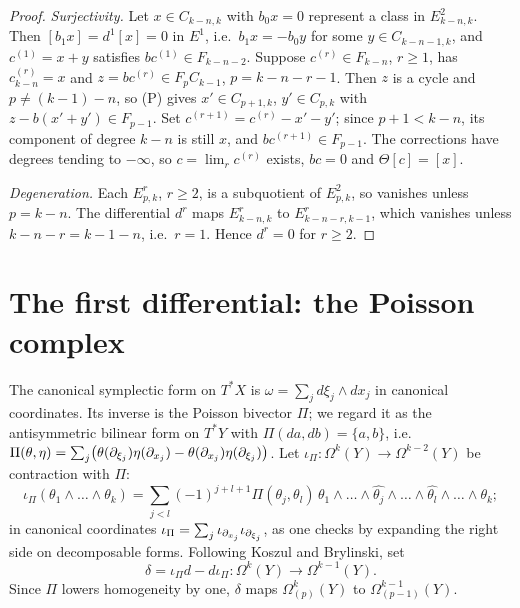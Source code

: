 \begin{proof}
\emph{Surjectivity.} Let $x\in C_{k-n,k}$ with $b_0x=0$ represent a class in
$E^2_{k-n,k}$. Then $[b_1x]=d^1[x]=0$ in $E^1$, i.e.\ $b_1x=-b_0y$ for some
$y\in C_{k-n-1,k}$, and $c^{(1)}=x+y$ satisfies $bc^{(1)}\in F_{k-n-2}$.
Suppose $c^{(r)}\in F_{k-n}$, $r\ge1$, has $c^{(r)}_{k-n}=x$ and
$z=bc^{(r)}\in F_{p}C_{k-1}$, $p=k-n-r-1$. Then $z$ is a cycle and
$p\ne(k-1)-n$, so (P) gives $x'\in C_{p+1,k}$, $y'\in C_{p,k}$ with
$z-b(x'+y')\in F_{p-1}$. Set $c^{(r+1)}=c^{(r)}-x'-y'$; since $p+1<k-n$, its
component of degree $k-n$ is still $x$, and $bc^{(r+1)}\in F_{p-1}$. The
corrections have degrees tending to $-\infty$, so $c=\lim_rc^{(r)}$ exists,
$bc=0$ and $\Theta[c]=[x]$.

\emph{Degeneration.} Each $E^r_{p,k}$, $r\ge2$, is a subquotient of
$E^2_{p,k}$, so vanishes unless $p=k-n$. The differential $d^r$ maps
$E^r_{k-n,k}$ to $E^r_{k-n-r,k-1}$, which vanishes unless $k-n-r=k-1-n$, i.e.\
$r=1$. Hence $d^r=0$ for $r\ge2$.
\end{proof}

\section{The first differential: the Poisson complex}\label{hochschild:sec:d1}

The canonical symplectic form on $T^*X$ is $\omega=\sum_jd\xi_j\wedge dx_j$ in
canonical coordinates. Its inverse is the Poisson bivector $\Pi$; we regard it
as the antisymmetric bilinear form on $T^*Y$ with
$\Pi(da,db)=\{a,b\}$, i.e.\ $\Pi(\theta,\eta)=\sum_j\bigl(\theta(\partial_{\xi_j})\eta(\partial_{x_j})-
\theta(\partial_{x_j})\eta(\partial_{\xi_j})\bigr)$. Let $\iota_\Pi:\Omega^k(Y)\to\Omega^{k-2}(Y)$
be contraction with $\Pi$:
\begin{equation*}
  \iota_\Pi(\theta_1\wedge\dots\wedge\theta_k)=\sum_{j<l}(-1)^{j+l+1}
  \Pi(\theta_j,\theta_l)\,\theta_1\wedge\dots\wedge\widehat{\theta_j}\wedge\dots
  \wedge\widehat{\theta_l}\wedge\dots\wedge\theta_k ;
\end{equation*}
in canonical coordinates $\iota_\Pi=\sum_j\iota_{\partial_{x_j}}\iota_{\partial_{\xi_j}}$,
as one checks by expanding the right side on decomposable forms. Following
Koszul and Brylinski, set
\begin{equation*}
  \delta=\iota_\Pi d-d\iota_\Pi:\Omega^k(Y)\longrightarrow\Omega^{k-1}(Y).
\end{equation*}
Since $\Pi$ lowers homogeneity by one, $\delta$ maps $\Omega^k_{(p)}(Y)$ to
$\Omega^{k-1}_{(p-1)}(Y)$.

